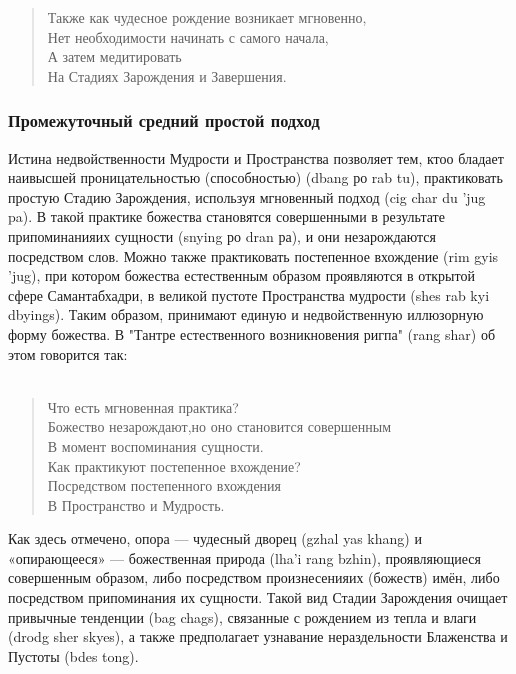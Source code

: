 \begin{verse}
Также как чудесное рождение возникает мгновенно,\\
Нет необходимости начинать с самого начала,\\
А затем медитировать\\
На Стадиях Зарождения и Завершения.\\
\end{verse}

\subsubsection{Промежуточный средний простой подход}

Истина недвойственности Мудрости и Пространства позволяет тем, ктоо бладает
наивысшей проницательностью (способностью) (dbang ро rab tu), практиковать простую
Стадию Зарождения, используя мгновенный подход (cig char du 'jug pa). В такой практике
божества становятся совершенными в результате припоминанияих сущности (snying ро dran
ра), и они незарождаются посредством слов. Можно также практиковать постепенное
вхождение (rim gyis 'jug), при котором божества естественным образом проявляются в
открытой сфере Самантабхадри, в великой пустоте Пространства мудрости (shes rab kyi
dbyings). Таким образом, принимают единую и недвойственную иллюзорную форму
божества. В "Тантре естественного возникновения ригпа" (rang shar) об этом говорится так:\\
\\
\begin{verse}
Что есть мгновенная практика?\\
Божество незарождают,но оно становится совершенным\\
В момент воспоминания сущности.\\
Как практикуют постепенное вхождение?\\
Посредством постепенного вхождения\\
В Пространство и Мудрость.\\
\end{verse}

Как здесь отмечено, опора — чудесный дворец (gzhal yas khang) и «опирающееся» —
божественная природа (lha'i rang bzhin), проявляющиеся совершенным
образом, либо посредством произнесенияих (божеств) имён, либо посредством
припоминания их сущности. Такой вид Стадии Зарождения очищает привычные тенденции
(bag chags), связанные с рождением из тепла и влаги (drodg sher skyes), а также
предполагает узнавание нераздельности Блаженства и Пустоты (bdes tong).

